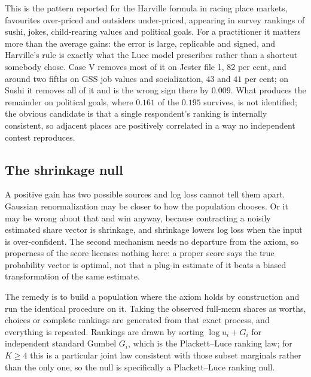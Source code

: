 \documentclass[11pt]{article}
\theoremstyle{italichead}
\begin{document}
This is the pattern reported for the Harville formula in racing place markets, favourites
over-priced and outsiders under-priced, appearing in survey rankings of sushi, jokes,
child-rearing values and political goals. For a practitioner it matters more than the average
gains: the error is large, replicable and signed, and Harville's rule is exactly what the Luce
model prescribes rather than a shortcut somebody chose. Case V removes most of it on Jester file 1, $82$ per cent, and
around two fifths on GSS job values and socialization, $43$ and $41$ per cent; on Sushi it removes
all of it and is the wrong sign there by $0.009$. What produces the remainder on political goals,
where $0.161$ of the $0.195$ survives, is not identified; the obvious candidate is that a single
respondent's ranking is internally consistent, so adjacent places are positively correlated in a
way no independent contest reproduces.

\subsection{The shrinkage null}
\label{sec:null}

A positive gain has two possible sources and log loss cannot tell them apart. Gaussian
renormalization may be closer to how the population chooses. Or it may be wrong about that and
win anyway, because contracting a noisily estimated share vector is shrinkage, and
shrinkage lowers log loss when the input is over-confident. The second mechanism needs
no departure from the axiom, so properness of the score licenses nothing here: a proper
score says the true probability vector is optimal, not that a plug-in estimate of it
beats a biased transformation of the same estimate.

The remedy is to build a population where the axiom holds by construction and run the
identical procedure on it. Taking the observed full-menu shares as worths, choices or
complete rankings are generated from that exact process, and everything is repeated.
Rankings are drawn by sorting $\log u_i + G_i$ for independent standard Gumbel $G_i$,
which is the Plackett--Luce ranking law; for $K \ge 4$ this is a particular joint law
consistent with those subset marginals rather than the only one, so the null is
specifically a Plackett--Luce ranking null.
\end{document}
